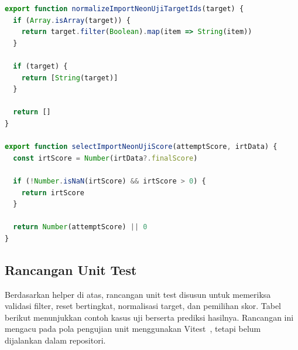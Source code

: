 \begin{lstlisting}[language=JavaScript, caption={Cuplikan normalisasi target dan pemilihan skor}, label={lst:helper_score_import_neon_uji}]
export function normalizeImportNeonUjiTargetIds(target) {
  if (Array.isArray(target)) {
    return target.filter(Boolean).map(item => String(item))
  }

  if (target) {
    return [String(target)]
  }

  return []
}

export function selectImportNeonUjiScore(attemptScore, irtData) {
  const irtScore = Number(irtData?.finalScore)

  if (!Number.isNaN(irtScore) && irtScore > 0) {
    return irtScore
  }

  return Number(attemptScore) || 0
}
\end{lstlisting}

\subsection{Rancangan Unit Test}
Berdasarkan helper di atas, rancangan unit test disusun untuk memeriksa validasi filter, reset bertingkat, normalisasi target, dan pemilihan skor. Tabel berikut menunjukkan contoh kasus uji berserta prediksi hasilnya. Rancangan ini mengacu pada pola pengujian unit menggunakan Vitest~\cite{vitest_docs}, tetapi belum dijalankan dalam repositori.

